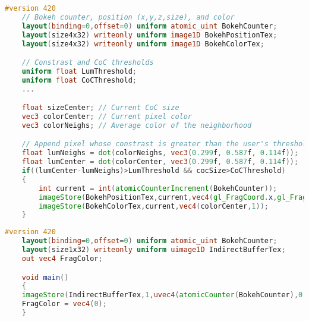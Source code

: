 \begin{lstlisting}[language=GLSL,float={htb},caption={Fragment shader for extracting \bokehs \emph{(Pass 2)}.},label={DeRousiers:bokehextractionfs}]	
	#version 420
	// Bokeh counter, position (x,y,z,size), and color
	layout(binding=0,offset=0) uniform atomic_uint BokehCounter;
	layout(size4x32) writeonly uniform image1D BokehPositionTex;
	layout(size4x32) writeonly uniform image1D BokehColorTex;

	// Constrast and CoC thresholds
	uniform float LumThreshold;
	uniform float CoCThreshold;
	...

	float sizeCenter; // Current CoC size
	vec3 colorCenter; // Current pixel color
	vec3 colorNeighs; // Average color of the neighborhood

	// Append pixel whose constrast is greater than the user's threshold
	float lumNeighs = dot(colorNeighs, vec3(0.299f, 0.587f, 0.114f));
	float lumCenter = dot(colorCenter, vec3(0.299f, 0.587f, 0.114f));
	if((lumCenter-lumNeighs)>LumThreshold && cocSize>CoCThreshold)
	{
		int current = int(atomicCounterIncrement(BokehCounter));
		imageStore(BokehPositionTex,current,vec4(gl_FragCoord.x,gl_FragCoord.y,gl_FragCoord.z,sizeCenter));
		imageStore(BokehColorTex,current,vec4(colorCenter,1));
	}
\end{lstlisting}

\begin{lstlisting}[language=GLSL,float={htb},caption={Synchronization of the indirect buffer with the atomic counter \emph{(Pass 3/4)}.},label={DeRousiers:synchronizationbokehfs}]
	#version 420
	layout(binding=0,offset=0) uniform atomic_uint BokehCounter;
	layout(size1x32) writeonly uniform uimage1D IndirectBufferTex;
	out vec4 FragColor;

	void main()
	{
	imageStore(IndirectBufferTex,1,uvec4(atomicCounter(BokehCounter),0,0,0));
	FragColor = vec4(0);
	}
\end{lstlisting}

